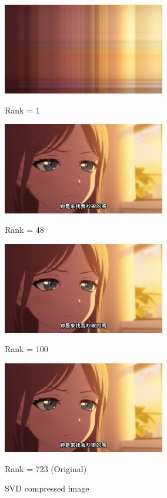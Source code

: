 \begin{figure}[H]
  \centering
  \begin{minipage}[h]{0.45\linewidth}
    \centering
    \includegraphics[height=4cm]{./Figures/SVD/rank_001.jpg}
    \caption{Rank = 1}
  \end{minipage}
  \hfill
  \begin{minipage}[h]{0.45\linewidth}
    \centering
    \includegraphics[height=4cm]{./Figures/SVD/rank_048.jpg}
    \caption{Rank = 48}
  \end{minipage}

  \vspace{1em} %

  \begin{minipage}[h]{0.45\linewidth}
    \centering
    \includegraphics[height=4cm]{./Figures/SVD/rank_100.jpg}
    \caption{Rank = 100}
  \end{minipage}
  \hfill
  \begin{minipage}[h]{0.45\linewidth}
    \centering
    \includegraphics[height=4cm]{./Figures/SVD/rank_723.jpg}
    \caption{Rank = 723 (Original)}
  \end{minipage}

  \caption{SVD compressed image}
\end{figure}

